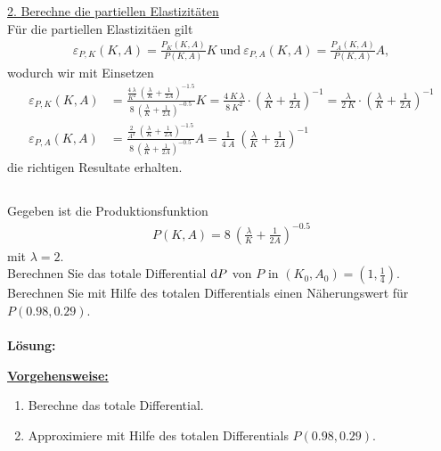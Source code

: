 \underline{2. Berechne die partiellen Elastizitäten}\\
Für die partiellen Elastizitäen gilt
\begin{align*}
\varepsilon_{P,K}(K,A) = \frac{P_K(K,A)}{P(K,A)} K
\ \text{und} \
\varepsilon_{P,A}(K,A) =  \frac{P_A(K,A)}{P(K,A)} A,
\end{align*}
wodurch wir mit Einsetzen 
\begin{align*}
\varepsilon_{P,K}(K,A) 
&=  \frac{\frac{4 \ \lambda}{K^2}  \  \left( \frac{\lambda}{K} +\frac{1}{2A} \right)^{-1.5} }{8 \ \left( \frac{\lambda}{K} +\frac{1}{2A} \right)^{-0.5}} K
= \frac{4 \ K \ \lambda}{8 \ K^2} \cdot \left( \frac{\lambda}{K} +\frac{1}{2A} \right)^{-1}
= \frac{ \lambda}{2 \ K} \cdot \left( \frac{\lambda}{K} +\frac{1}{2A} \right)^{-1} \\
\varepsilon_{P,A}(K,A)
&=  \frac{\frac{2}{ A^2}  \ \left( \frac{\lambda}{K} +\frac{1}{2A} \right)^{-1.5}}{8 \ \left( \frac{\lambda}{K} +\frac{1}{2A} \right)^{-0.5}} A
= \frac{1}{4 \ A} \ \left( \frac{\lambda}{K} +\frac{1}{2A} \right)^{-1} 
\end{align*}
die richtigen Resultate erhalten.
\newpage

\subsection*{}
Gegeben ist die Produktionsfunktion
\begin{align*}
P(K,A)= 
8 \ \left( \frac{\lambda}{K} +\frac{1}{2A} \right)^{-0.5}
\end{align*}
mit $\lambda = 2$.\\
Berechnen Sie das totale Differential $\text{\rmfamily d} P$ von $P$
in $(K_0,A_0)= \left( 1, \frac{1}{4} \right)$.\\
Berechnen Sie mit Hilfe des totalen Differentials einen Näherungswert für $P(0.98,0.29)$.
\\
\\ 
\textbf{Lösung:}
\begin{mdframed}
\underline{\textbf{Vorgehensweise:}}
\begin{enumerate}
\item Berechne das totale Differential.
\item Approximiere mit Hilfe des totalen Differentials $P(0.98,0.29)$.
\end{enumerate}
\end{mdframed}

